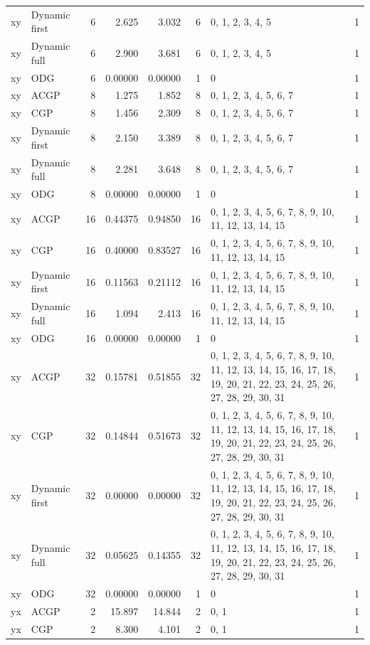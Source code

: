 \documentclass[10pt,a4paper]{article}
\begin{document}
\begin{longtable}{@{}p{23mm}p{29mm}rrrrp{36mm}r@{}}
xy & Dynamic first & 6 & 2.625 & 3.032 & 6 & 0, 1, 2, 3, 4, 5 & 1 \\
xy & Dynamic full & 6 & 2.900 & 3.681 & 6 & 0, 1, 2, 3, 4, 5 & 1 \\
xy & ODG & 6 & 0.00000 & 0.00000 & 1 & 0 & 1 \\
xy & ACGP & 8 & 1.275 & 1.852 & 8 & 0, 1, 2, 3, 4, 5, 6, 7 & 1 \\
xy & CGP & 8 & 1.456 & 2.309 & 8 & 0, 1, 2, 3, 4, 5, 6, 7 & 1 \\
xy & Dynamic first & 8 & 2.150 & 3.389 & 8 & 0, 1, 2, 3, 4, 5, 6, 7 & 1 \\
xy & Dynamic full & 8 & 2.281 & 3.648 & 8 & 0, 1, 2, 3, 4, 5, 6, 7 & 1 \\
xy & ODG & 8 & 0.00000 & 0.00000 & 1 & 0 & 1 \\
xy & ACGP & 16 & 0.44375 & 0.94850 & 16 & 0, 1, 2, 3, 4, 5, 6, 7, 8, 9, 10, 11, 12, 13, 14, 15 & 1 \\
xy & CGP & 16 & 0.40000 & 0.83527 & 16 & 0, 1, 2, 3, 4, 5, 6, 7, 8, 9, 10, 11, 12, 13, 14, 15 & 1 \\
xy & Dynamic first & 16 & 0.11563 & 0.21112 & 16 & 0, 1, 2, 3, 4, 5, 6, 7, 8, 9, 10, 11, 12, 13, 14, 15 & 1 \\
xy & Dynamic full & 16 & 1.094 & 2.413 & 16 & 0, 1, 2, 3, 4, 5, 6, 7, 8, 9, 10, 11, 12, 13, 14, 15 & 1 \\
xy & ODG & 16 & 0.00000 & 0.00000 & 1 & 0 & 1 \\
xy & ACGP & 32 & 0.15781 & 0.51855 & 32 & 0, 1, 2, 3, 4, 5, 6, 7, 8, 9, 10, 11, 12, 13, 14, 15, 16, 17, 18, 19, 20, 21, 22, 23, 24, 25, 26, 27, 28, 29, 30, 31 & 1 \\
xy & CGP & 32 & 0.14844 & 0.51673 & 32 & 0, 1, 2, 3, 4, 5, 6, 7, 8, 9, 10, 11, 12, 13, 14, 15, 16, 17, 18, 19, 20, 21, 22, 23, 24, 25, 26, 27, 28, 29, 30, 31 & 1 \\
xy & Dynamic first & 32 & 0.00000 & 0.00000 & 32 & 0, 1, 2, 3, 4, 5, 6, 7, 8, 9, 10, 11, 12, 13, 14, 15, 16, 17, 18, 19, 20, 21, 22, 23, 24, 25, 26, 27, 28, 29, 30, 31 & 1 \\
xy & Dynamic full & 32 & 0.05625 & 0.14355 & 32 & 0, 1, 2, 3, 4, 5, 6, 7, 8, 9, 10, 11, 12, 13, 14, 15, 16, 17, 18, 19, 20, 21, 22, 23, 24, 25, 26, 27, 28, 29, 30, 31 & 1 \\
xy & ODG & 32 & 0.00000 & 0.00000 & 1 & 0 & 1 \\
yx & ACGP & 2 & 15.897 & 14.844 & 2 & 0, 1 & 1 \\
yx & CGP & 2 & 8.300 & 4.101 & 2 & 0, 1 & 1 \\

\end{longtable}
\end{document}
